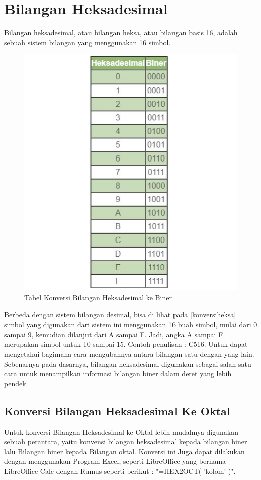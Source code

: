 {\section{Bilangan Heksadesimal}
Bilangan heksadesimal, atau bilangan heksa, atau bilangan basis 16, adalah sebuah sistem bilangan yang menggunakan 16 simbol.
\begin{figure}[ht]
\centerline{\includegraphics[width=1\textwidth]{figures/konversiheksa.JPG}}
\caption{Tabel Konversi Bilangan Heksadesimal ke Biner}
\label{Tabel Konversi}
\end{figure}
Berbeda dengan sistem bilangan desimal, bisa di lihat pada \ref{konversiheksa} simbol yang digunakan dari sistem ini menggunakan 16  buah simbol, mulai dari 0 sampai 9, kemudian dilanjut dari A sampai F. Jadi, angka A sampai F merupakan simbol untuk 10 sampai 15. Contoh penulisan : C516.
Untuk dapat mengetahui bagimana cara mengubahnya antara bilangan satu dengan yang lain. Sebenarnya pada dasarnya, bilangan heksadesimal digunakan sebagai salah satu cara untuk menampilkan informasi bilangan biner dalam deret yang lebih pendek.
\subsection{Konversi Bilangan Heksadesimal Ke Oktal}
Untuk konversi Bilangan Heksadesimal ke Oktal lebih mudahnya digunakan sebuah perantara, yaitu konvensi bilangan heksadesimal kepada bilangan biner lalu Bilangan biner kepada Bilangan oktal.
Konversi ini Juga dapat dilakukan dengan menggunakan Program Excel, seperti LibreOffice yang bernama LibreOffice-Calc dengan Rumus seperti berikut :  "=HEX2OCT( 'kolom' )".
}
